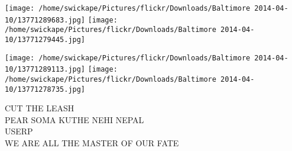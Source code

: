 \documentclass[10pt,letterpaper]{article}
\begin{document}
\texttt{[image: /home/swickape/Pictures/flickr/Downloads/Baltimore 2014-04-10/13771289683.jpg]}
\texttt{[image: /home/swickape/Pictures/flickr/Downloads/Baltimore 2014-04-10/13771279445.jpg]}

\texttt{[image: /home/swickape/Pictures/flickr/Downloads/Baltimore 2014-04-10/13771289113.jpg]}
\texttt{[image: /home/swickape/Pictures/flickr/Downloads/Baltimore 2014-04-10/13771278735.jpg]}

CUT THE LEASH\\
PEAR SOMA KUTHE NEHI NEPAL\\
USERP\\
WE ARE ALL THE MASTER OF OUR FATE\\
\pagebreak
\end{document}
